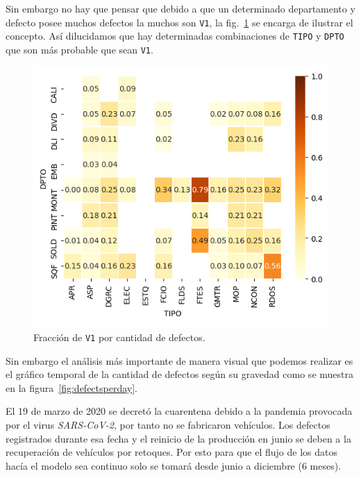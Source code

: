 \documentclass[a4paper,12pt]{article}
\begin{document}
Sin embargo no hay que pensar que debido a que un determinado departamento y defecto posee muchos defectos la muchos son \texttt{V1}, la fig.~\ref{fig:heatmapfractionv1} se encarga de ilustrar el concepto. Así dilucidamos que hay determinadas combinaciones de \texttt{TIPO} y \texttt{DPTO} que son más probable que sean \texttt{V1}.

\begin{figure}[H]
	\begin{center}
	\includegraphics[width=1\textwidth]{tesis_58.png}
  	\caption{Fracción de \texttt{V1} por cantidad de defectos.}
  	\label{fig:heatmapfractionv1}
  	\end{center}
\end{figure}

Sin embargo el análisis más importante de manera visual que podemos realizar es el gráfico temporal de la cantidad de defectos según su gravedad como se muestra en la figura~\ref{fig:defectsperday}. 

El 19 de marzo de 2020 se decretó la cuarentena debido a la pandemia provocada por el virus \textit{SARS-CoV-2}, por tanto no se fabricaron vehículos. Los defectos registrados durante esa fecha y el reinicio de la producción en junio se deben a la recuperación de vehículos por retoques. Por esto para que el flujo de los datos hacía el modelo sea continuo solo se tomará desde junio a diciembre (6 meses).
\end{document}
